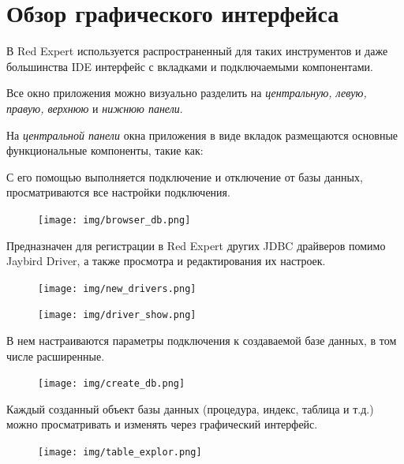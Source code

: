 \newpage
\section{Обзор графического интерфейса}\label{sec:overview}

В Red Expert используется распространенный для таких инструментов и даже большинства IDE интерфейс с вкладками и подключаемыми компонентами.

Все окно приложения можно визуально разделить на  \textit{центральную, левую, правую, верхнюю} и  \textit{нижнюю панели}.

На \textit{центральной панели} окна приложения в виде вкладок размещаются основные функциональные компоненты, такие как:


С его помощью выполняется подключение и отключение от базы данных, просматриваются все настройки подключения.
	\begin{figure}[H]
		\centering
		\texttt{[image: img/browser\_db.png]}
	\end{figure}

Предназначен для регистрации в Red Expert других JDBC драйверов помимо Jaybird Driver, а также просмотра и редактирования их настроек.
	\begin{figure}[H]
		\centering
		\texttt{[image: img/new\_drivers.png]}
	\end{figure}
	\begin{figure}[H]
		\centering
		\texttt{[image: img/driver\_show.png]}
	\end{figure}


В нем настраиваются параметры подключения к создаваемой базе данных, в том числе расширенные.
\begin{figure}[H]
	\centering
	\texttt{[image: img/create\_db.png]}
\end{figure}


Каждый созданный объект базы данных (процедура, индекс, таблица и т.д.) можно просматривать и изменять через графический интерфейс.
	\begin{figure}[H]
		\centering
		\texttt{[image: img/table\_explor.png]}
	\end{figure}

